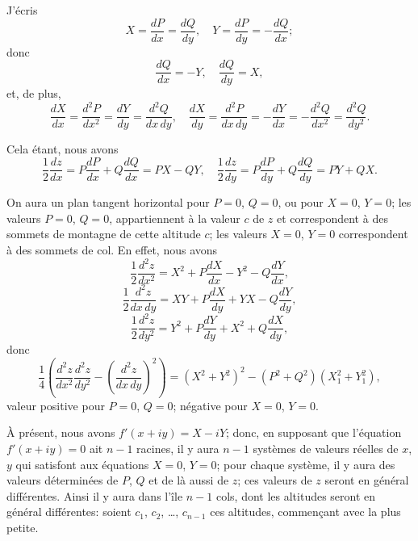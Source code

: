 \documentclass[11pt,a4paper]{article}
\begin{document}
J'\'ecris
\[
X = \frac{dP}{dx} = \frac{dQ}{dy},\quad Y = \frac{dP}{dy} = -\frac{dQ}{dx};
\]
donc
\[
\frac{dQ}{dx} = -Y,\quad \frac{dQ}{dy} = X,
\]
et, de plus,
\[
\frac{dX}{dx} = \frac{d^2P}{dx^2} = \frac{dY}{dy} = \frac{d^2Q}{dx\,dy},\quad \frac{dX}{dy} = \frac{d^2P}{dx\,dy} = -\frac{dY}{dx} = -\frac{d^2Q}{dx^2} = \frac{d^2Q}{dy^2}.
\]

Cela \'etant, nous avons
\[
\frac{1}{2}\frac{dz}{dx} = P\frac{dP}{dx} + Q\frac{dQ}{dx} = PX - QY,\quad \frac{1}{2}\frac{dz}{dy} = P\frac{dP}{dy} + Q\frac{dQ}{dy} = PY + QX.
\]

On aura un plan tangent horizontal pour $P = 0$, $Q = 0$, ou pour $X = 0$, $Y = 0$; les valeurs $P = 0$, $Q = 0$, appartiennent \`a la valeur $c$ de $z$ et correspondent \`a des sommets de montagne de cette altitude $c$; les valeurs $X = 0$, $Y = 0$ correspondent \`a des sommets de col. En effet, nous avons
\[
\frac{1}{2}\frac{d^2z}{dx^2} = X^2 + P\frac{dX}{dx} - Y^2 - Q\frac{dY}{dx},
\]
\[
\frac{1}{2}\frac{d^2z}{dx\,dy} = XY + P\frac{dX}{dy} + YX - Q\frac{dY}{dy},
\]
\[
\frac{1}{2}\frac{d^2z}{dy^2} = Y^2 + P\frac{dY}{dy} + X^2 + Q\frac{dX}{dy},
\]
donc
\[
\frac{1}{4}\left(\frac{d^2z}{dx^2}\frac{d^2z}{dy^2} - \left(\frac{d^2z}{dx\,dy}\right)^2\right) = (X^2 + Y^2)^2 - (P^2 + Q^2)(X_1^2 + Y_1^2),
\]
valeur positive pour $P = 0$, $Q = 0$; n\'egative pour $X = 0$, $Y = 0$.

\`A pr\'esent, nous avons $f'(x + iy) = X - iY$; donc, en supposant que l'\'equation $f'(x + iy) = 0$ ait $n - 1$ racines, il y aura $n-1$ syst\`emes de valeurs r\'eelles de $x$, $y$ qui satisfont aux \'equations $X = 0$, $Y = 0$; pour chaque syst\`eme, il y aura des valeurs d\'etermin\'ees de $P$, $Q$ et de l\`a aussi de $z$; ces valeurs de $z$ seront en g\'en\'eral diff\'erentes. Ainsi il y aura dans l'\^ile $n-1$ cols, dont les altitudes seront en g\'en\'eral diff\'erentes: soient $c_1$, $c_2$, \ldots, $c_{n-1}$ ces altitudes, commen\c{c}ant avec la plus petite.
\end{document}

